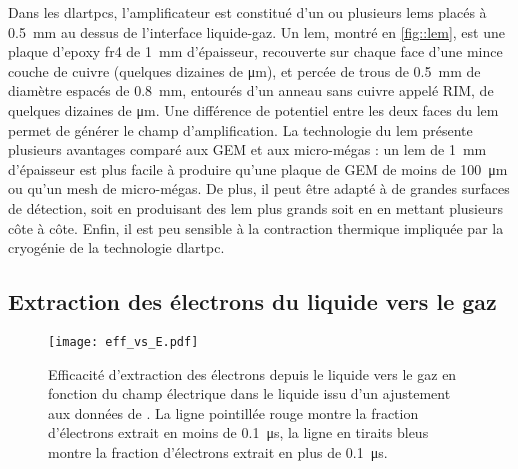       Dans les \glspl{dlartpc}, l'amplificateur est constitué d'un ou plusieurs \glspl{lem} placés à \SI{0.5}{\milli\meter} au dessus de l'interface liquide-gaz. Un \gls{lem}, montré en \autoref{fig::lem}, est une plaque d'epoxy \gls{fr4} de \SI{1}{\milli\meter} d'épaisseur, recouverte sur chaque face d'une mince couche de cuivre (quelques dizaines de \si{\micro\meter}), et percée de trous de \SI{0.5}{\milli\meter} de diamètre espacés de \SI{0.8}{\milli\meter}, entourés d'un anneau sans cuivre appelé RIM, de quelques dizaines de \si{\micro\meter}. Une différence de potentiel entre les deux faces du \gls{lem} permet de générer le champ d'amplification. La technologie du \gls{lem} présente plusieurs avantages comparé aux GEM et aux micro-mégas : un \gls{lem} de \SI{1}{\milli\meter} d'épaisseur est plus facile à produire qu'une plaque de GEM de moins de \SI{100}{\micro\meter} ou qu'un mesh de micro-mégas. De plus, il peut être adapté à de grandes surfaces de détection, soit en produisant des \gls{lem} plus grands soit en en mettant plusieurs côte à côte. Enfin, il est peu sensible à la contraction thermique impliquée par la cryogénie de la technologie \gls{dlartpc}.

    \subsection{Extraction des électrons du liquide vers le gaz}

      \begin{figure}[htbp]
        \centering
        \texttt{[image: eff\_vs\_E.pdf]}
        \caption[Efficacité d'extraction des électrons depuis le liquide vers le gaz en fonction du champ électrique.]{\label{fig::guschin}Efficacité d'extraction des électrons depuis le liquide vers le gaz en fonction du champ électrique dans le liquide issu d'un ajustement aux données de \cite{guschin}. La ligne pointillée rouge montre la fraction d'électrons extrait en moins de \SI{0.1}{\micro\second}, la ligne en tiraits bleus montre la fraction d'électrons extrait en plus de \SI{0.1}{\micro\second}.}
      \end{figure}

